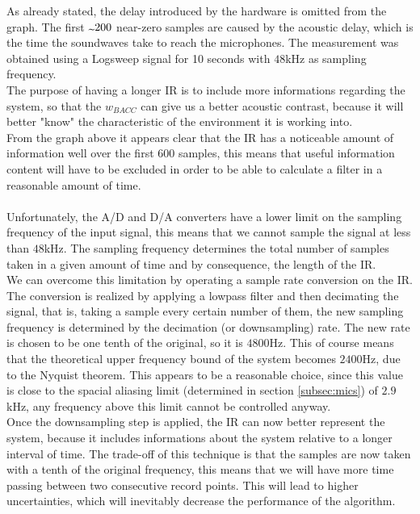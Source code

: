As already stated, the delay introduced by the hardware is omitted from the graph. The first $\tld 200$ near-zero samples are caused by the acoustic delay, which is the time the soundwaves take to reach the microphones. The measurement was obtained using a Logsweep signal for 10 seconds with $48$kHz as sampling frequency. 
\\
The purpose of having a longer IR is to include more informations regarding the system, so that the $w_{BACC}$ can give us a better acoustic contrast, because it will better "know" the characteristic of the environment it is working into.
\\
From the graph above it appears clear that the IR has a noticeable amount of information well over the first 600 samples, this means that useful information content will have to be excluded in order to be able to calculate a filter in a reasonable amount of time.
\\
\\
Unfortunately, the A/D and D/A converters have a lower limit on the sampling frequency of the input signal, this means that we cannot sample the signal at less than $48$kHz. The sampling frequency determines the total number of samples taken in a given amount of time and by consequence, the length of the IR.
\\
We can overcome this limitation by operating a sample rate conversion on the IR. The conversion is realized by applying a lowpass filter and then decimating the signal, that is, taking a sample every certain number of them, the new sampling frequency is determined by the decimation (or downsampling) rate. The new rate is chosen to be one tenth of the original, so it is $4800$Hz. This of course means that the theoretical upper frequency bound of the system becomes $2400$Hz, due to the Nyquist theorem. This appears to be a reasonable choice, since this value is close to the spacial aliasing limit (determined in section \ref{subsec:mics}) of \tld$2.9$kHz, any frequency above this limit cannot be controlled anyway.
\\
Once the downsampling step is applied, the IR can now better represent the system, because it includes informations about the system relative to a longer interval of time. The trade-off of this technique is that the samples are now taken with a tenth of the original frequency, this means that we will have more time passing between two consecutive record points. This will lead to higher uncertainties, which will inevitably decrease the performance of the algorithm.
\\
